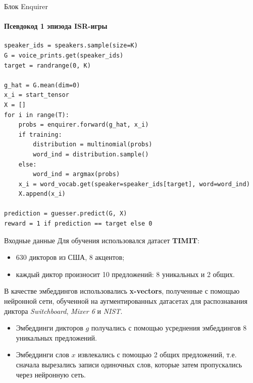 \documentclass{beamer}
\begin{document}
\begin{frame}[fragile]{Блок Enquirer}
\framesubtitle{Псевдокод 1 эпизода ISR-игры}
\footnotesize
\begin{verbatim}
speaker_ids = speakers.sample(size=K)
G = voice_prints.get(speaker_ids)
target = randrange(0, K)

g_hat = G.mean(dim=0)
x_i = start_tensor
X = []
for i in range(T):
    probs = enquirer.forward(g_hat, x_i)
    if training:
        distribution = multinomial(probs)
        word_ind = distribution.sample()
    else:
        word_ind = argmax(probs)
    x_i = word_vocab.get(speaker=speaker_ids[target], word=word_ind)
    X.append(x_i)

prediction = guesser.predict(G, X)
reward = 1 if prediction == target else 0
\end{verbatim}
\end{frame}

\begin{frame}{Входные данные}
    Для обучения использовался датасет \textbf{TIMIT}:
    \begin{itemize}
        \item 630 дикторов из США, 8 акцентов;
        \item каждый диктор произносит 10 предложений: 8 уникальных и 2 общих.
    \end{itemize}

    В качестве эмбеддингов использовались \textbf{x-vectors}, полученные с помощью нейронной сети, обученной на аугментированных датасетах для распознавания диктора \textit{Switchboard}, \textit{Mixer 6} и \textit{NIST}.
    \begin{itemize}
        \item Эмбеддинги дикторов $g$ получались с помощью усреднения
        эмбеддингов 8 уникальных предложений.
        \item Эмбеддинги слов $x$ извлекались с помощью 2 общих предложений,
        т.е. сначала вырезались записи одиночных слов, которые затем
        пропускались через нейронную сеть.
    \end{itemize}
\end{frame}
\end{document}
